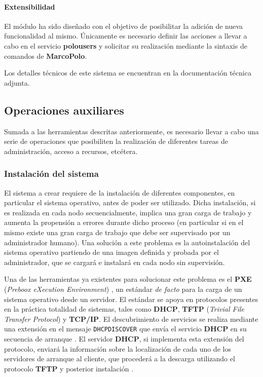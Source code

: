 \paragraph{Extensibilidad\\}

El módulo ha sido diseñado con el objetivo de posibilitar la adición de nueva funcionalidad al mismo. Únicamente es necesario definir las acciones a llevar a cabo en el servicio \textbf{polousers} y solicitar su realización mediante la sintaxis de comandos de \textbf{MarcoPolo}.

\vspace{2cm}

Los detalles técnicos de este sistema se encuentran en la documentación técnica adjunta.


\subsection{Operaciones auxiliares}

Sumada a las herramientas descritas anteriormente, es necesario llevar a cabo una serie de operaciones que posibiliten la realización de diferentes tareas de administración, acceso a recursos, etcétera.

\subsubsection{Instalación del sistema}

El sistema a crear requiere de la instalación de diferentes componentes, en particular el sistema operativo, antes de poder ser utilizado. Dicha instalación, si es realizada en cada nodo secuencialmente, implica una gran carga de trabajo y aumenta la propensión a errores durante dicho proceso (en particular si en el mismo existe una gran carga de trabajo que debe ser supervisado por un administrador humano). Una solución a este problema es la autoinstalación del sistema operativo partiendo de una imagen definida y probada por el administrador, que se cargará e instalará en cada nodo sin supervisión.

Una de las herramientas ya existentes para solucionar este problema es el \textbf{PXE} (\textit{Preboox eXecution Environment}) \cite{pxeintel}, un estándar \textit{de facto} \cite{avramov:architecture} para la carga de un sistema operativo desde un servidor. El estándar se apoya en protocolos presentes en la práctica totalidad de sistemas, tales como \textbf{DHCP}, \textbf{TFTP} (\textit{Trivial File Transfer Protocol}) y \textbf{TCP/IP}. El descubrimiento de servicios se realiza mediante una extensión en el mensaje \texttt{DHCPDISCOVER} que envía el servicio \textbf{DHCP} en su secuencia de arranque \cite{rfc4578}. El servidor \textbf{DHCP}, si implementa esta extensión del protocolo, enviará la información sobre la localización de cada uno de los servidores de arranque al cliente, que procederá a la descarga utilizando el protocolo \textbf{TFTP} y posterior instalación \cite{pxeoverview}.

